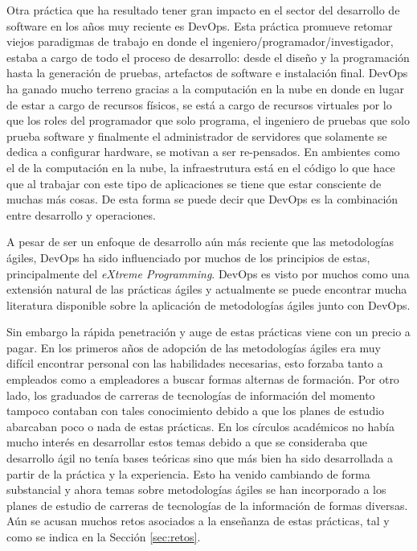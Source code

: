 \documentclass[journal]{IEEEtran}
\begin{document}
Otra práctica que ha resultado tener gran impacto en el sector del desarrollo de software en los años muy reciente es DevOps. Esta práctica promueve retomar viejos paradigmas de trabajo en donde el ingeniero/programador/investigador, estaba a cargo de todo el proceso de desarrollo: desde el diseño y la programación hasta la generación de pruebas, artefactos de software e instalación final. DevOps ha ganado mucho terreno gracias a la computación en la nube en donde en lugar de estar a cargo de recursos físicos, se está a cargo de recursos virtuales por lo que los roles del programador que solo programa, el ingeniero de pruebas que solo prueba software y finalmente el administrador de servidores que solamente se dedica a configurar hardware, se motivan a ser re-pensados. En ambientes como el de la computación en la nube, la infraestrutura está en el código lo que hace que al trabajar con este tipo de aplicaciones se tiene que estar consciente de muchas más cosas. De esta forma se puede decir que DevOps es la combinación entre desarrollo y operaciones. 

A pesar de ser un enfoque de desarrollo aún más reciente que las metodologías ágiles, DevOps ha sido influenciado por muchos de los principios de estas, principalmente del \emph{eXtreme Programming}. DevOps es visto por muchos como una extensión natural de las prácticas ágiles\cite{henrik-b} y actualmente se puede encontrar mucha literatura disponible sobre la aplicación de metodologías ágiles junto con DevOps.

Sin embargo la rápida penetración y auge de estas prácticas viene con un precio a pagar. En los primeros años de adopción de las metodologías ágiles era muy difícil encontrar personal con las habilidades necesarias, esto forzaba tanto a empleados como a empleadores a buscar formas alternas de formación. Por otro lado, los graduados de carreras de tecnologías de información del momento tampoco contaban con tales conocimiento debido a que los planes de estudio abarcaban poco o nada de estas prácticas. En los círculos académicos no había mucho interés en desarrollar estos temas debido a que se consideraba que desarrollo ágil no tenía bases teóricas sino que más bien ha sido desarrollada a partir de la práctica y la experiencia\cite{hazzan-dubinsky}. Esto ha venido cambiando de forma substancial y ahora temas sobre metodologías ágiles se han incorporado a los planes de estudio de carreras de tecnologías de la información de formas diversas. Aún se acusan muchos retos asociados a la enseñanza de estas prácticas, tal y como se indica en la Sección \ref{sec:retos}.
\end{document}
